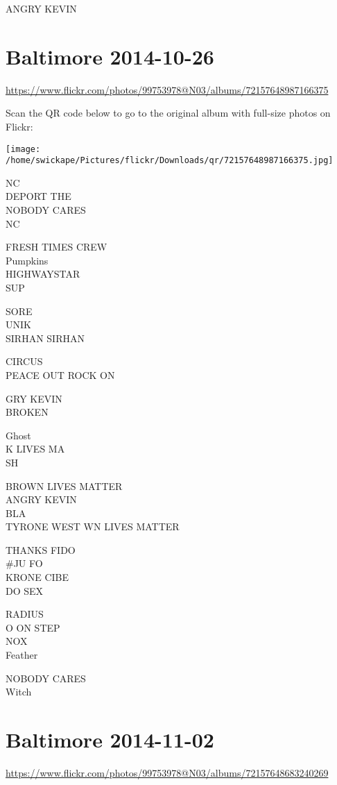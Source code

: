 \documentclass[10pt,letterpaper]{article}
\begin{document}
ANGRY KEVIN
\pagebreak

\section*{Baltimore 2014-10-26}

\url{https://www.flickr.com/photos/99753978@N03/albums/72157648987166375}

Scan the QR code below to go to the original album with full-size photos on Flickr:

\texttt{[image: /home/swickape/Pictures/flickr/Downloads/qr/72157648987166375.jpg]}
\pagebreak

NC\\
DEPORT THE\\
NOBODY CARES\\
NC

FRESH TIMES CREW\\
Pumpkins\\
HIGHWAYSTAR\\
SUP

SORE\\
UNIK\\
SIRHAN SIRHAN

CIRCUS\\
PEACE OUT ROCK ON

GRY KEVIN\\
BROKEN

Ghost\\
K LIVES MA\\
SH

BROWN LIVES MATTER\\
ANGRY KEVIN\\
BLA\\
TYRONE WEST WN LIVES MATTER

THANKS FIDO\\
\#JU FO\\
KRONE CIBE\\
DO SEX

RADIUS\\
O ON STEP\\
NOX\\
Feather

NOBODY CARES\\
Witch
\pagebreak

\section*{Baltimore 2014-11-02}

\url{https://www.flickr.com/photos/99753978@N03/albums/72157648683240269}
\end{document}
